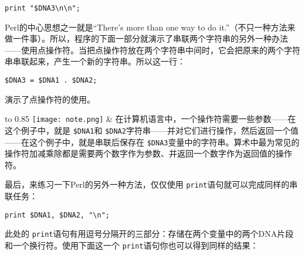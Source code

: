\begin{lstlisting}
print "$DNA3\n\n";
\end{lstlisting}

Perl的中心思想之一就是“There's more than one way to do it.”（不只一种方法来做一件事）。所以，程序的下面一部分就演示了串联两个字符串的另外一种办法——使用点操作符。当把点操作符放在两个字符串中间时，它会把原来的两个字符串串联起来，产生一个新的字符串。所以这一行：

\begin{lstlisting}
$DNA3 = $DNA1 . $DNA2;
\end{lstlisting}
演示了点操作符的使用。


\vspace{-5pt}
\begin{table}[h]
  \begin{center}
    \begin{tabu*} to 0.85\linewidth {|X[1,r,m]X[15,l,m]|}
      \tabucline{-}
      \texttt{[image: note.png]} & 在计算机语言中，一个操作符需要一些参数——在这个例子中，就是 \verb|$DNA1|和 \verb|$DNA2|字符串——并对它们进行操作，然后返回一个值——在这个例子中，就是串联后保存在 \verb|$DNA3|变量中的字符串。算术中最为常见的操作符加减乘除都是需要两个数字作为参数、并返回一个数字作为返回值的操作符。\\
      \tabucline{-}
    \end{tabu*}
  \end{center}
\end{table}
\vspace{-20pt}

最后，来练习一下Perl的另外一种方法，仅仅使用 \verb|print|语句就可以完成同样的串联任务：

\begin{lstlisting}
print $DNA1, $DNA2, "\n";
\end{lstlisting}

此处的 \verb|print|语句有用逗号分隔开的三部分：存储在两个变量中的两个DNA片段和一个换行符。使用下面这一个 \verb|print|语句你也可以得到同样的结果：

